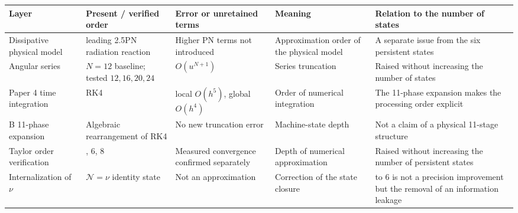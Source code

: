 \documentclass[
  a4paper,
]{article}
\newcounter{none} %
\begin{document}
{\def\LTcaptype{none} %
\begin{longtable}[]{@{}
  >{\raggedright\arraybackslash}p{}
  >{\raggedright\arraybackslash}p{}
  >{\raggedright\arraybackslash}p{}
  >{\raggedright\arraybackslash}p{}
  >{\raggedright\arraybackslash}p{}@{}}
\toprule\noalign{}
\begin{minipage}[b]{\linewidth}\raggedright
Layer
\end{minipage} & \begin{minipage}[b]{\linewidth}\raggedright
Present / verified order
\end{minipage} & \begin{minipage}[b]{\linewidth}\raggedright
Error or unretained terms
\end{minipage} & \begin{minipage}[b]{\linewidth}\raggedright
Meaning
\end{minipage} & \begin{minipage}[b]{\linewidth}\raggedright
Relation to the number of states
\end{minipage} \\
\midrule\noalign{}
\endhead
\bottomrule\noalign{}
\endlastfoot
Dissipative physical model & leading 2.5PN radiation reaction & Higher
PN terms not introduced & Approximation order of the physical model & A
separate issue from the six persistent states \\
Angular series & \(N=12\) baseline; tested \(12,16,20,24\) &
\(O(u^{N+1})\) & Series truncation & Raised without increasing the
number of states \\
Paper 4 time integration & RK4 & local \(O(h^5)\), global \(O(h^4)\) &
Order of numerical integration & The 11-phase expansion makes the
processing order explicit \\
B 11-phase expansion & Algebraic rearrangement of RK4 & No new
truncation error & Machine-state depth & Not a claim of a physical
11-stage structure \\
Taylor order verification & 4, 6, 8 & Measured convergence confirmed
separately & Depth of numerical approximation & Raised without
increasing the number of persistent states \\
Internalization of \(\nu\) & \(\mathcal N=\nu\) identity state & Not an
approximation & Correction of the state closure & 5 to 6 is not a
precision improvement but the removal of an information leakage \\
\end{longtable}
}
\end{document}
